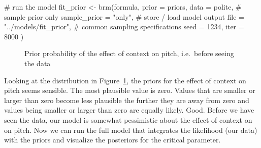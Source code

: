 \documentclass[
  doc,
  floatsintext,
  longtable,
  nolmodern,
  notxfonts,
  notimes,
  colorlinks=true,linkcolor=blue,citecolor=blue,urlcolor=blue]{apa7}
\newenvironment{Shaded}{\begin{snugshade}}{\end{snugshade}}
\newcommand{\AttributeTok}[1]{\textcolor[rgb]{0.40,0.45,0.13}{#1}}
\newcommand{\CommentTok}[1]{\textcolor[rgb]{0.37,0.37,0.37}{#1}}
\newcommand{\DecValTok}[1]{\textcolor[rgb]{0.68,0.00,0.00}{#1}}
\newcommand{\FunctionTok}[1]{\textcolor[rgb]{0.28,0.35,0.67}{#1}}
\newcommand{\NormalTok}[1]{\textcolor[rgb]{0.00,0.23,0.31}{#1}}
\newcommand{\OtherTok}[1]{\textcolor[rgb]{0.00,0.23,0.31}{#1}}
\newcommand{\StringTok}[1]{\textcolor[rgb]{0.13,0.47,0.30}{#1}}
\begin{document}
\begin{Shaded}
\begin{Highlighting}[]
\CommentTok{\# run the model}
\NormalTok{fit\_prior }\OtherTok{\textless{}{-}} \FunctionTok{brm}\NormalTok{(formula, }\AttributeTok{prior =}\NormalTok{ priors, }\AttributeTok{data =}\NormalTok{ polite,}
           \CommentTok{\# sample prior only}
           \AttributeTok{sample\_prior =} \StringTok{"only"}\NormalTok{,}
           \CommentTok{\# store / load model output}
           \AttributeTok{file  =} \StringTok{"../models/fit\_prior"}\NormalTok{,}
           \CommentTok{\# common sampling specifications}
           \AttributeTok{seed =} \DecValTok{1234}\NormalTok{, }\AttributeTok{iter =} \DecValTok{8000}
\NormalTok{           )}
\end{Highlighting}
\end{Shaded}

\begin{figure}[!tbp]

\caption{\label{fig-plot-priors}Prior probability of the effect of
context on pitch, i.e.~before seeing the data}


\end{figure}%

Looking at the distribution in Figure~\ref{fig-plot-priors}, the priors
for the effect of context on pitch seems sensible. The most plausible
value is zero. Values that are smaller or larger than zero become less
plausible the further they are away from zero and values being smaller
or larger than zero are equally likely. Good. Before we have seen the
data, our model is somewhat pessimistic about the effect of context on
on pitch. Now we can run the full model that integrates the likelihood
(our data) with the priors and visualize the posteriors for the critical
parameter.
\end{document}
